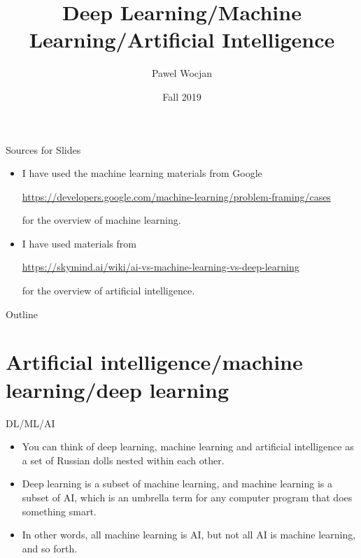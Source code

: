\documentclass{beamer}
\title[AI]{Deep Learning/Machine Learning/Artificial Intelligence}
\author{Pawel Wocjan}
\institute{University of Central Florida}
\date{Fall 2019}
\begin{document}
\begin{frame}
  \titlepage
\end{frame}

\begin{frame}{Sources for Slides}

\begin{itemize}
\item I have used the machine learning materials from Google

{\small 
\url{https://developers.google.com/machine-learning/problem-framing/cases}
}

for the overview of machine learning.

\item  I have used materials from 

\url{https://skymind.ai/wiki/ai-vs-machine-learning-vs-deep-learning} 

for the overview of artificial intelligence.
\end{itemize}
\end{frame}

\begin{frame}{Outline}
  \tableofcontents
\end{frame}

\section{Artificial intelligence/machine learning/deep learning}

\begin{frame}{DL/ML/AI}
\begin{itemize}
\item You can think of deep learning, machine learning and artificial intelligence as a set of Russian dolls nested within each other. 
\item Deep learning is a subset of machine learning, and machine learning is a subset of AI, which is an umbrella term for any computer program that does something smart. \item In other words, all machine learning is AI, but not all AI is machine learning, and so forth.
\end{itemize}
\end{frame}
\end{document}
